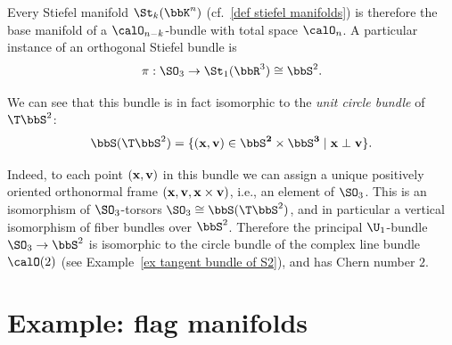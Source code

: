 \begin{example}\label{ex O2 Stiefel bundle}
    Every Stiefel manifold $\St_k(\bbK^n)$ (cf.\ \ref{def stiefel manifolds}) is therefore the base manifold of a $\calO_{n-k}$-bundle with total space $\calO_n$. A particular instance of an orthogonal Stiefel bundle is \[\pi:\SO_3\to \St_1(\bbR^3)\cong \bbS^2.\]

    We can see that this bundle is in fact isomorphic to the \emph{unit circle bundle} of $\T\bbS^2$:
    \[\bbS(\T\bbS^2)=\{(\bf{x},\bf{v})\in\bbS^2\times\bbS^3\mid \bf{x}\perp\bf{v}\}.\]

    Indeed, to each point $(\bf{x},\bf{v})$ in this bundle we can assign a unique positively oriented orthonormal frame $(\bf{x},\bf{v},\bf{x}\times\bf{v})$, i.e., an element of $\SO_3$. This is an isomorphism of $\SO_3$-torsors $\SO_3\cong \bbS(\T\bbS^2)$, and in particular a vertical isomorphism of fiber bundles over $\bbS^2$.  Therefore the principal $\U_1$-bundle $\SO_3\to \bbS^2$ is isomorphic to the circle bundle of the complex line bundle $\calO(2)$ (see Example~\ref{ex tangent bundle of S2}), and has Chern number $2$.
\end{example}





\section{Example: flag manifolds}\label{sec: flag manifolds}


